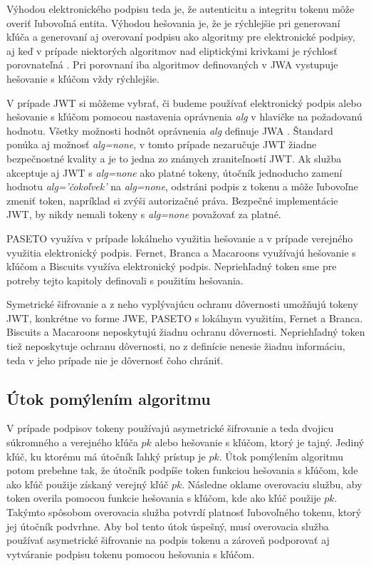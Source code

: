Výhodou elektronického podpisu teda je, že autenticitu a integritu tokenu môže overiť ľubovoľná entita. Výhodou hešovania je, že je rýchlejšie pri generovaní kľúča a generovaní aj overovaní podpisu ako algoritmy pre elektronické podpisy, aj keď v prípade niektorých algoritmov nad eliptickými krivkami je rýchlosť porovnateľná \cite{hmac_perf}. Pri porovnaní iba algoritmov definovaných v JWA \cite{hmac_jwt_perf} vystupuje hešovanie s kľúčom vždy rýchlejšie.

V prípade JWT si môžeme vybrať, či budeme používať elektronický podpis alebo hešovanie s kľúčom pomocou nastavenia oprávnenia \textit{alg} v hlavičke na požadovanú hodnotu. Všetky možnosti hodnôt oprávnenia \textit{alg} definuje  JWA \cite{jwa_rfc}. Štandard ponúka aj možnosť \textit{alg=none}, v tomto prípade nezaručuje JWT žiadne bezpečnostné kvality a je to jedna zo známych zraniteľností \cite{jwt_vul} JWT. Ak služba akceptuje aj JWT s \textit{alg=none} ako platné tokeny, útočník jednoducho zamení hodnotu \textit{alg='čokoľvek'} na \textit{alg=none}, odstráni podpis z tokenu a môže ľubovoľne zmeniť token, napríklad si zvýši autorizačné práva. Bezpečné implementácie JWT, by nikdy nemali tokeny s \textit{alg=none} považovať za platné.

PASETO využíva v prípade lokálneho využitia hešovanie a v prípade verejného využitia elektronický podpis. Fernet, Branca a Macaroons využívajú hešovanie s kľúčom a Biscuits využíva elektronický podpis. Nepriehľadný token sme pre potreby tejto kapitoly definovali s použitím hešovania.

Symetrické šifrovanie a z neho vyplývajúcu ochranu dôvernosti umožňujú tokeny JWT, konkrétne vo forme JWE, PASETO s lokálnym využitím, Fernet a Branca. Biscuits a Macaroons neposkytujú žiadnu ochranu dôvernosti. Nepriehľadný token tiež neposkytuje ochranu dôvernosti, no z definície nenesie žiadnu informáciu, teda v jeho prípade nie je dôvernosť čoho chrániť.

\subsection{Útok pomýlením algoritmu}

V prípade podpisov tokeny používajú asymetrické šifrovanie a teda dvojicu súkromného a verejného kľúča $pk$ alebo hešovanie s kľúčom, ktorý je tajný. Jediný kľúč, ku ktorému má útočník ľahký prístup je $pk$. Útok pomýlením algoritmu potom prebehne tak, že útočník podpíše token funkciou hešovania s kľúčom, kde ako kľúč použije získaný verejný kľúč $pk$. Následne oklame overovaciu službu, aby token overila pomocou funkcie hešovania s kľúčom, kde ako kľúč použije $pk$. Takýmto spôsobom overovacia služba potvrdí platnosť ľubovoľného tokenu, ktorý jej útočník podvrhne. Aby bol tento útok úspešný, musí overovacia služba používať asymetrické šifrovanie na podpis tokenu a zároveň podporovať aj vytváranie podpisu tokenu pomocou hešovania s kľúčom.

